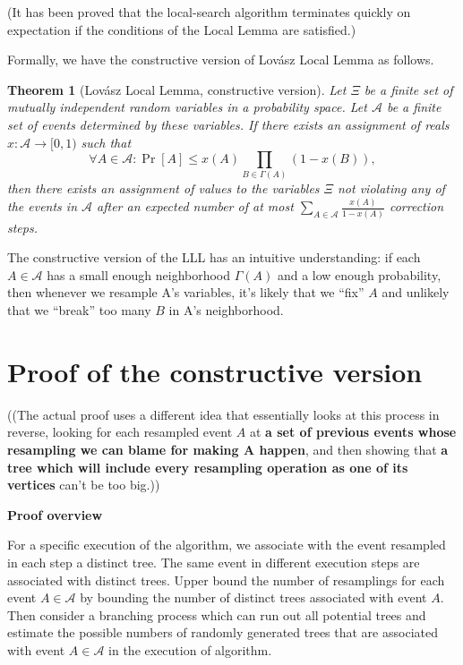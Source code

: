 \documentclass[twoside]{article}
\newcounter{lecnum}
\newtheorem{theorem}{Theorem}[lecnum]
\begin{document}
(It has been proved that the local-search algorithm terminates quickly on expectation if the conditions of the Local Lemma are satisfied.)

Formally, we have the constructive version of Lov\'{a}sz Local Lemma as follows. 
\begin{theorem}[Lov\'{a}sz Local Lemma, constructive version]
Let $\Xi$ be a finite set of mutually independent random variables in a probability space. Let $\mathcal{A}$ be a finite set of events determined by these variables. If there exists an assignment of reals $x:\mathcal{A}\rightarrow [0,1)$ such that 
$$\forall A\in \mathcal{A}:\Pr[A]\leq x(A)\prod_{B\in \Gamma(A)}(1-x(B)),$$
then there exists an assignment of values to the variables $\Xi$ not violating any of the events in $\mathcal{A}$ after an expected number of at most $\sum_{A\in\mathcal{A}}\frac{x(A)}{1-x(A)}$ correction steps.
\end{theorem}

The constructive version of the LLL has an intuitive understanding: if each $A\in\mathcal{A}$ has a small enough neighborhood $\Gamma(A)$ and a low enough probability, then whenever we resample A's variables, it's likely that we ``fix'' $A$ and unlikely that we ``break'' too many $B$ in A's neighborhood.

\section{Proof of the constructive version}

((The actual proof uses a different idea that essentially looks at this process in reverse, looking for each resampled event $A$ at \textbf{a set of previous events whose resampling we can blame for making A happen}, and then showing that \textbf{a tree which will include every resampling operation as one of its vertices} can't be too big.))

\textbf{Proof overview}

For a specific execution of the algorithm, we associate with the event resampled in each step a distinct tree. The same event in different execution steps are associated with distinct trees. Upper bound the number of resamplings for each event $A\in\mathcal{A}$ by bounding the number of distinct trees associated with event $A$. Then consider a branching process which can run out all potential trees and estimate the possible numbers of randomly generated trees that are associated with event $A\in\mathcal{A}$ in the execution of algorithm. 
\end{document}
